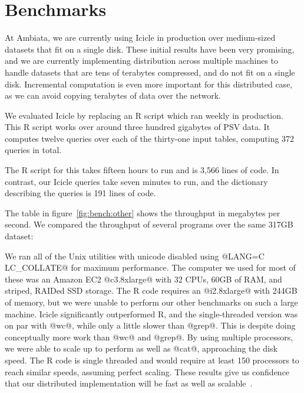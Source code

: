 \section{Benchmarks}
\label{s:Benchmarks}


At Ambiata, we are currently using Icicle in production over medium-sized datasets that fit on a single disk.
These initial results have been very promising, and we are currently implementing distribution across multiple machines to handle datasets that are tens of terabytes compressed, and do not fit on a single disk.
Incremental computation is even more important for this distributed case, as we can avoid copying terabytes of data over the network.

We evaluated Icicle by replacing an R script which ran weekly in production.
This R script works over around three hundred gigabytes of PSV data.
It computes twelve queries over each of the thirty-one input tables, computing 372 queries in total.

The R script for this takes fifteen hours to run and is 3,566 lines of code.
In contrast, our Icicle queries take seven minutes to run, and the dictionary describing the queries is 191 lines of code.

The table in figure~\ref{fig:bench:other} shows the throughput in megabytes per second.
We compared the throughput of several programs over the same 317GB dataset:

We ran all of the Unix utilities with unicode disabled using @LANG=C LC_COLLATE@ for maximum performance.
The computer we used for most of these was an Amazon EC2 @c3.8xlarge@ with 32 CPUs, 60GB of RAM, and striped, RAIDed SSD storage.
The R code requires an @i2.8xlarge@ with 244GB of memory, but we were unable to perform our other benchmarks on such a large machine.
Icicle significantly outperformed R, and the single-threaded version was on par with @wc@, while only a little slower than @grep@.
This is despite doing conceptually more work than @wc@ and @grep@.
By using multiple processors, we were able to scale up to perform as well as @cat@, approaching the disk speed.
The R code is single threaded and would require at least 150 processors to reach similar speeds, assuming perfect scaling.
These results give us confidence that our distributed implementation will be fast as well as scalable~\cite{mcsherry2015scalability}.

